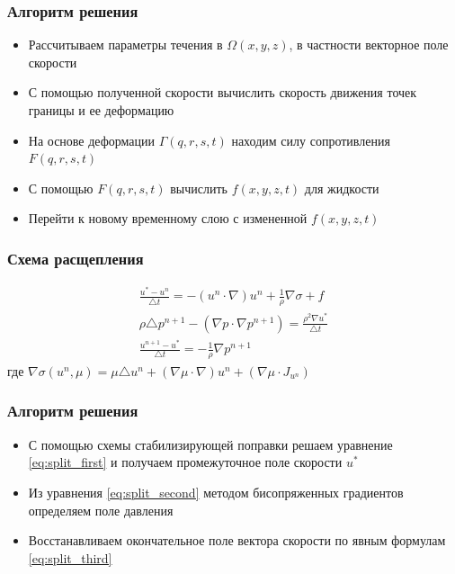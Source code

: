 \documentclass[14pt]{beamer}
\begin{document}
\begin{frame}
\frametitle{Алгоритм решения}
    \begin{itemize}
        \item \alert<+>{Рассчитываем параметры течения в $\Omega(x, y, z)$, в частности векторное поле скорости}
        \item \alert<+>{С помощью полученной скорости вычислить скорость движения точек границы и ее деформацию}
        \item \alert<+>{На основе деформации $\Gamma(q, r, s, t)$ находим силу сопротивления $F(q, r, s, t)$}
        \item \alert<+>{С помощью $F(q, r, s, t)$ вычислить $f(x, y, z, t)$ для жидкости}
        \item \alert<+>{Перейти к новому временному слою с измененной $f(x, y, z, t)$}
    \end{itemize}
\end{frame}

\begin{frame}
\frametitle{Схема расщепления}
\begin{gather}
    \label{eq:split_first}
    \frac{u^* - u^n}{\triangle t} = - (u^n \cdot \nabla) u^n + \frac{1}{\rho} \nabla \sigma + f\\
    \label{eq:split_second}
    \rho \triangle p^{n+1} - (\nabla p \cdot \nabla p^{n+1}) = \frac{\rho^2 \nabla u^*}{\triangle t}\\
    \label{eq:split_third}
    \frac{u^{n+1} - u^*}{\triangle t} = - \frac{1}{\rho} \nabla p^{n+1}
\end{gather}
где $\nabla \sigma (u^n, \mu) = \mu \triangle u^n + (\nabla \mu \cdot \nabla) u^n + (\nabla \mu \cdot J_{u^n}) $
\end{frame}

\begin{frame}
\frametitle{Алгоритм решения}
    \begin{itemize}
        \item \alert<+>{С помощью схемы стабилизирующей поправки решаем уравнение \eqref{eq:split_first} и получаем промежуточное поле скорости $u^*$}
        \item \alert<+>{Из уравнения \eqref{eq:split_second} методом бисопряженных градиентов определяем поле давления}
        \item \alert<+>{Восстанавливаем окончательное поле вектора скорости по явным формулам \eqref{eq:split_third}}
    \end{itemize}
\end{frame}
\end{document}
